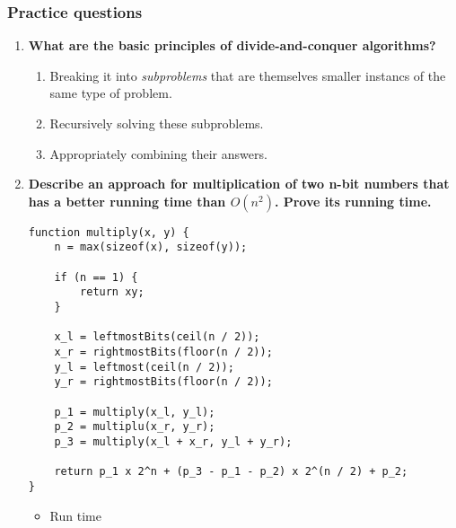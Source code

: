 \documentclass[a4paper,11pt]{article}
\begin{document}
\subsubsection{Practice questions}\label{practice-questions-5}

\begin{enumerate}
\def\labelenumi{\arabic{enumi}.}
\item
  \textbf{What are the basic principles of divide-and-conquer
  algorithms?}

  \begin{enumerate}
  \def\labelenumii{\arabic{enumii}.}
  \itemsep1pt\parskip0pt
  \item
    Breaking it into \emph{subproblems} that are themselves smaller
    instancs of the same type of problem.
  \item
    Recursively solving these subproblems.
  \item
    Appropriately combining their answers.
  \end{enumerate}
\item
  \textbf{Describe an approach for multiplication of two n-bit numbers
  that has a better running time than $O(n^2)$. Prove its running time.}

\begin{verbatim}
function multiply(x, y) {
    n = max(sizeof(x), sizeof(y));

    if (n == 1) {
        return xy;
    }

    x_l = leftmostBits(ceil(n / 2));
    x_r = rightmostBits(floor(n / 2));
    y_l = leftmost(ceil(n / 2));
    y_r = rightmostBits(floor(n / 2));

    p_1 = multiply(x_l, y_l);
    p_2 = multiplu(x_r, y_r);
    p_3 = multiply(x_l + x_r, y_l + y_r);

    return p_1 x 2^n + (p_3 - p_1 - p_2) x 2^(n / 2) + p_2;
}
\end{verbatim}

  \begin{itemize}
  \itemsep1pt\parskip0pt
  \item
    Run time


\end{itemize}
\end{enumerate}
\end{document}
